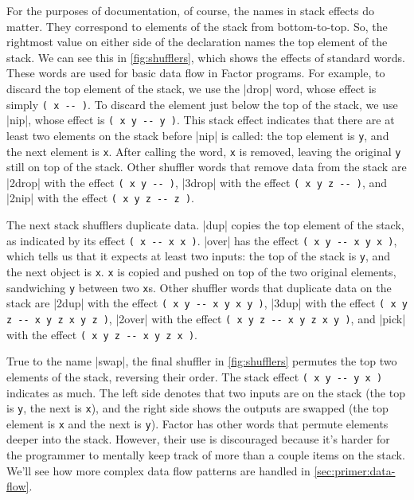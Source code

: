 For the purposes of documentation, of course, the names in stack effects do
matter.  They correspond to elements of the stack from bottom-to-top.  So, the
rightmost value on either side of the declaration names the top element of the
stack.  We can see this in \cref{fig:shufflers}, which shows the effects of
standard  words.  These words are used for basic data flow
in Factor programs.  For example, to discard the top element of the stack, we
use the \factor|drop| word, whose effect is simply
%
\Verb|( x -- )|.
%
To discard the element just below the top of the stack, we use \factor|nip|,
whose effect is
%
\Verb|( x y -- y )|.
%
This stack effect indicates that there are at least two elements on the stack
before \factor|nip| is called: the top element is \Verb|y|, and the next
element is \Verb|x|.  After calling the word, \Verb|x| is removed, leaving
the original \Verb|y| still on top of the stack.  Other shuffler words that
remove data from the stack are
%
\factor|2drop| with the effect \Verb|( x y -- )|,
%
\factor|3drop| with the effect \Verb|( x y z -- )|, and
%
\factor|2nip| with the effect \Verb|( x y z -- z )|.

The next stack shufflers duplicate data.  \factor|dup| copies the top element
of the stack, as indicated by its effect \Verb|( x -- x x )|.  \factor|over|
has the effect \Verb|( x y -- x y x )|, which tells us that it expects at
least two inputs: the top of the stack is \Verb|y|, and the next object is
\Verb|x|.  \Verb|x| is copied and pushed on top of the two original
elements, sandwiching \Verb|y| between two \Verb|x|s.  Other shuffler words
that duplicate data on the stack are
%
\factor|2dup| with the effect \Verb|( x y -- x y x y )|,
%
\factor|3dup| with the effect \Verb|( x y z -- x y z x y z )|,
%
\factor|2over| with the effect \Verb|( x y z -- x y z x y )|, and
%
\factor|pick| with the effect \Verb|( x y z -- x y z x )|.

True to the name \factor|swap|, the final shuffler in \cref{fig:shufflers}
permutes the top two elements of the stack, reversing their order.  The stack
effect
%
\Verb|( x y -- y x )|
%
indicates as much.  The left side denotes that two inputs are on the stack (the
top is \Verb|y|, the next is \Verb|x|), and the right side shows the
outputs are swapped (the top element is \Verb|x| and the next is \Verb|y|).
Factor has other words that permute elements deeper into the stack.  However,
their use is discouraged because it's harder for the programmer to mentally
keep track of more than a couple items on the stack.  We'll see how more
complex data flow patterns are handled in \cref{sec:primer:data-flow}.
